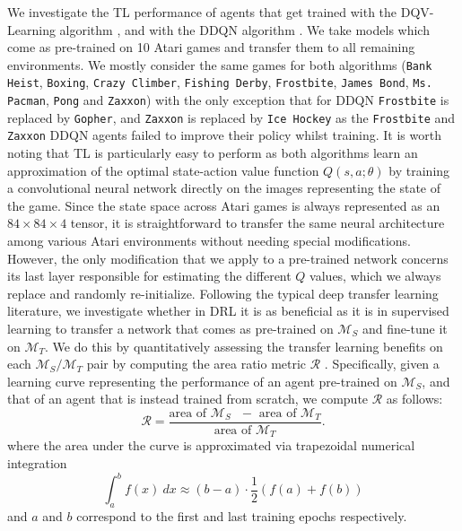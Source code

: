 We investigate the TL performance of agents that get trained with the DQV-Learning algorithm \citep{sabatelli2018deep}, and with the DDQN algorithm \citep{van2016deep}. We take models which come as pre-trained on 10 Atari games and transfer them to all remaining environments. We mostly consider the same games for both algorithms (\texttt{Bank Heist}, \texttt{Boxing}, \texttt{Crazy Climber}, \texttt{Fishing Derby}, \texttt{Frostbite}, \texttt{James Bond}, \texttt{Ms. Pacman}, \texttt{Pong} and \texttt{Zaxxon}) with the only exception that for DDQN \texttt{Frostbite} is replaced by \texttt{Gopher}, and \texttt{Zaxxon} is replaced by \texttt{Ice Hockey} as the \texttt{Frostbite} and \texttt{Zaxxon} DDQN agents failed to improve their policy whilst training. It is worth noting that TL is particularly easy to perform as both algorithms learn an approximation of the optimal state-action value function $Q(s,a;\theta)$ by training a convolutional neural network directly on the images representing the state of the game. Since the state space across Atari games is always represented as an $84\times84\times4$ tensor, it is straightforward to transfer the same neural architecture among various Atari environments without needing special modifications. However, the only modification that we apply to a pre-trained network concerns its last layer responsible for estimating the different $Q$ values, which we always replace and randomly re-initialize. Following the typical deep transfer learning literature, we investigate whether in DRL it is as beneficial as it is in supervised learning to transfer a network that comes as pre-trained on $\mathcal{M}_S$ and fine-tune it on $\mathcal{M}_T$. We do this by quantitatively assessing the transfer learning benefits on each $\mathcal{M}_S/\mathcal{M}_T$ pair by computing the area ratio metric $\mathscr{R}$ \citep{taylor2009transfer}. Specifically, given a learning curve representing the performance of an agent pre-trained on $\mathcal{M}_S$, and that of an agent that is instead trained from scratch, we compute $\mathscr{R}$ as follows:
\begin{equation}
	\mathscr{R} = \frac{\text{area of $\mathcal{M}_S$ $-$ area of $\mathcal{M}_T$}}{\text{area of $\mathcal{M}_T$}}.
\label{eq:area_ratio_metric}
\end{equation}
where the area under the curve is approximated via trapezoidal numerical integration
\begin{equation}
	\int^{b}_{a}f(x)\:dx \approx(b-a) \cdot \frac{1}{2}(f(a)+f(b))
\end{equation}
and $a$ and $b$ correspond to the first and last training epochs respectively.

